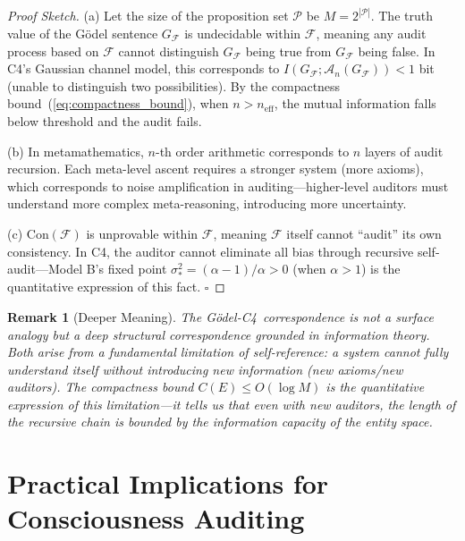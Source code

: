\documentclass[12pt,a4paper]{article}
\newtheorem{remark}[theorem]{Remark}
\theoremstyle{definition}
\newcommand{\Cfour}{\textsc{C4}}
\newcommand{\AuditOp}{\mathcal{A}}
\begin{document}
\begin{proof}[Proof Sketch]
(a) Let the size of the proposition set $\mathcal{P}$ be $M = 2^{|\mathcal{P}|}$. The truth value of the G\"{o}del sentence $G_{\mathcal{F}}$ is undecidable within $\mathcal{F}$, meaning any audit process based on $\mathcal{F}$ cannot distinguish $G_{\mathcal{F}}$ being true from $G_{\mathcal{F}}$ being false. In \Cfour's Gaussian channel model, this corresponds to $I(G_{\mathcal{F}}; \AuditOp_n(G_{\mathcal{F}})) < 1$ bit (unable to distinguish two possibilities). By the compactness bound~(\ref{eq:compactness_bound}), when $n > n_{\text{eff}}$, the mutual information falls below threshold and the audit fails.

(b) In metamathematics, $n$-th order arithmetic corresponds to $n$ layers of audit recursion. Each meta-level ascent requires a stronger system (more axioms), which corresponds to noise amplification in auditing---higher-level auditors must understand more complex meta-reasoning, introducing more uncertainty.

(c) $\mathrm{Con}(\mathcal{F})$ is unprovable within $\mathcal{F}$, meaning $\mathcal{F}$ itself cannot ``audit'' its own consistency. In \Cfour, the auditor cannot eliminate all bias through recursive self-audit---Model B's fixed point $\sigma_*^2 = (\alpha-1)/\alpha > 0$ (when $\alpha > 1$) is the quantitative expression of this fact. \hfill$\square$
\end{proof}

\begin{remark}[Deeper Meaning]
The G\"{o}del-\Cfour\ correspondence is not a surface analogy but a deep structural correspondence grounded in information theory. Both arise from a fundamental limitation of self-reference: a system cannot fully understand itself without introducing new information (new axioms/new auditors). The compactness bound $C(E) \leq O(\log M)$ is the quantitative expression of this limitation---it tells us that even with new auditors, the length of the recursive chain is bounded by the information capacity of the entity space.
\end{remark}

\section{Practical Implications for Consciousness Auditing}
\end{document}
